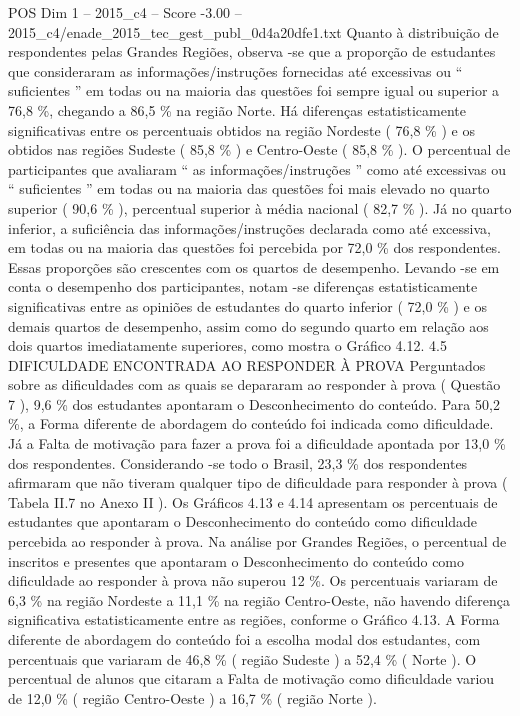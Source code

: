 \begin{textsample}{POS Dim 1 – 2015\_c4 – Score -3.00 – 2015\_c4/enade\_2015\_tec\_gest\_publ\_0d4a20dfe1.txt}
Quanto à distribuição de respondentes pelas Grandes Regiões, observa -se que a proporção de estudantes que consideraram as informações/instruções fornecidas até excessivas ou “ suficientes ” em todas ou na maioria das questões foi sempre igual ou superior a 76,8 \%, chegando a 86,5 \% na região Norte.
Há diferenças estatisticamente significativas entre os percentuais obtidos na região Nordeste ( 76,8 \% ) e os obtidos nas regiões Sudeste ( 85,8 \% ) e Centro-Oeste ( 85,8 \% ).
O percentual de participantes que avaliaram “ as informações/instruções ” como até excessivas ou “ suficientes ” em todas ou na maioria das questões foi mais elevado no quarto superior ( 90,6 \% ), percentual superior à média nacional ( 82,7 \% ).
Já no quarto inferior, a suficiência das informações/instruções declarada como até excessiva, em todas ou na maioria das questões foi percebida por 72,0 \% dos respondentes.
Essas proporções são crescentes com os quartos de desempenho.
Levando -se em conta o desempenho dos participantes, notam -se diferenças estatisticamente significativas entre as opiniões de estudantes do quarto inferior ( 72,0 \% ) e os demais quartos de desempenho, assim como do segundo quarto em relação aos dois quartos imediatamente superiores, como mostra o Gráfico 4.12. 4.5 DIFICULDADE ENCONTRADA AO RESPONDER À PROVA Perguntados sobre as dificuldades com as quais se depararam ao responder à prova ( Questão 7 ), 9,6 \% dos estudantes apontaram o Desconhecimento do conteúdo.
Para 50,2 \%, a Forma diferente de abordagem do conteúdo foi indicada como dificuldade.
Já a Falta de motivação para fazer a prova foi a dificuldade apontada por 13,0 \% dos respondentes.
Considerando -se todo o Brasil, 23,3 \% dos respondentes afirmaram que não tiveram qualquer tipo de dificuldade para responder à prova ( Tabela II.7 no Anexo II ).
Os Gráficos 4.13 e 4.14 apresentam os percentuais de estudantes que apontaram o Desconhecimento do conteúdo como dificuldade percebida ao responder à prova.
Na análise por Grandes Regiões, o percentual de inscritos e presentes que apontaram o Desconhecimento do conteúdo como dificuldade ao responder à prova não superou 12 \%.
Os percentuais variaram de 6,3 \% na região Nordeste a 11,1 \% na região Centro-Oeste, não havendo diferença significativa estatisticamente entre as regiões, conforme o Gráfico 4.13.
A Forma diferente de abordagem do conteúdo foi a escolha modal dos estudantes, com percentuais que variaram de 46,8 \% ( região Sudeste ) a 52,4 \% ( Norte ).
O percentual de alunos que citaram a Falta de motivação como dificuldade variou de 12,0 \% ( região Centro-Oeste ) a 16,7 \% ( região Norte ).

\end{textsample}
